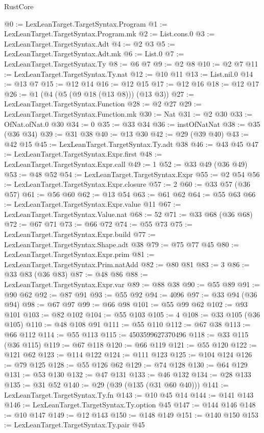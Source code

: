 \begin{lexlean}{RustCore}
\begin{coremodule}
@0 := LexLeanTarget.TargetSyntax.Program
@1 := LexLeanTarget.TargetSyntax.Program.mk
@2 := List.cons.{0}
@3 := LexLeanTarget.TargetSyntax.Adt
@4 := @2 @3
@5 := LexLeanTarget.TargetSyntax.Adt.mk
@6 := List.{0}
@7 := LexLeanTarget.TargetSyntax.Ty
@8 := @6 @7
@9 := @2 @8
@10 := @2 @7
@11 := LexLeanTarget.TargetSyntax.Ty.nat
@12 := @10 @11
@13 := List.nil.{0}
@14 := @13 @7
@15 := @12 @14
@16 := @12 @15
@17 := @12 @16
@18 := @12 @17
@26 := @1 (@4 (@5 (@9 @18 (@13 @8))) (@13 @3))
@27 := LexLeanTarget.TargetSyntax.Function
@28 := @2 @27
@29 := LexLeanTarget.TargetSyntax.Function.mk
@30 := Nat
@31 := @2 @30
@33 := OfNat.ofNat.{0} @30
@34 := 0
@35 := @33 @34
@36 := instOfNatNat
@38 := @35 (@36 @34)
@39 := @31 @38
@40 := @13 @30
@42 := @29 (@39 @40)
@43 := @42 @15
@45 := LexLeanTarget.TargetSyntax.Ty.adt @38
@46 := @43 @45
@47 := LexLeanTarget.TargetSyntax.Expr.first
@48 := LexLeanTarget.TargetSyntax.Expr.call
@49 := 1
@52 := @33 @49 (@36 @49)
@53 := @48 @52
@54 := LexLeanTarget.TargetSyntax.Expr
@55 := @2 @54
@56 := LexLeanTarget.TargetSyntax.Expr.closure
@57 := 2
@60 := @33 @57 (@36 @57)
@61 := @56 @60
@62 := @13 @54
@63 := @61 @62
@64 := @55 @63
@66 := LexLeanTarget.TargetSyntax.Expr.value @11
@67 := LexLeanTarget.TargetSyntax.Value.nat
@68 := 52
@71 := @33 @68 (@36 @68)
@72 := @67 @71
@73 := @66 @72
@74 := @55 @73
@75 := LexLeanTarget.TargetSyntax.Expr.build
@77 := LexLeanTarget.TargetSyntax.Shape.adt @38
@79 := @75 @77 @45
@80 := LexLeanTarget.TargetSyntax.Expr.prim
@81 := LexLeanTarget.TargetSyntax.Prim.natAdd
@82 := @80 @81
@83 := 3
@86 := @33 @83 (@36 @83)
@87 := @48 @86
@88 := LexLeanTarget.TargetSyntax.Expr.var
@89 := @88 @38
@90 := @55 @89
@91 := @90 @62
@92 := @87 @91
@93 := @55 @92
@94 := 4096
@97 := @33 @94 (@36 @94)
@98 := @67 @97
@99 := @66 @98
@101 := @55 @99 @62
@102 := @93 @101
@103 := @82 @102
@104 := @55 @103
@105 := 4
@108 := @33 @105 (@36 @105)
@110 := @48 @108 @91
@111 := @55 @110
@112 := @67 @38
@113 := @66 @112
@114 := @55 @113
@115 := 4503599627370496
@118 := @33 @115 (@36 @115)
@119 := @67 @118
@120 := @66 @119
@121 := @55 @120
@122 := @121 @62
@123 := @114 @122
@124 := @111 @123
@125 := @104 @124
@126 := @79 @125
@128 := @55 @126 @62
@129 := @74 @128
@130 := @64 @129
@131 := @53 @130
@132 := @47 @131
@133 := @46 @132
@134 := @28 @133
@135 := @31 @52
@140 := @29 (@39 (@135 (@31 @60 @40)))
@141 := LexLeanTarget.TargetSyntax.Ty.fn
@143 := @10 @45 @14
@144 := @141 @143
@146 := LexLeanTarget.TargetSyntax.Ty.option @45
@147 := @144 @146
@148 := @10 @147
@149 := @12 @143
@150 := @148 @149
@151 := @140 @150
@153 := LexLeanTarget.TargetSyntax.Ty.pair @45

\end{coremodule}
\end{lexlean}
